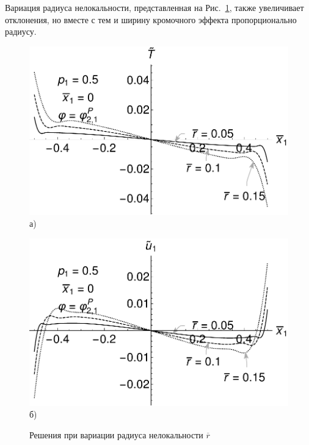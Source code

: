 Вариация радиуса нелокальности, представленная на Рис.~\ref{fig:VariationR}, также увеличивает отклонения, но вместе с тем и ширину кромочного эффекта пропорционально радиусу.

\begin{figure}[ht]
    \begin{minipage}[b][][b]{0.49\linewidth}\centering
        \includegraphics[width=\linewidth]{pics/TVarR.pdf} \\ а)
    \end{minipage}
    \hfill
    \begin{minipage}[b][][b]{0.49\linewidth}\centering
        \includegraphics[width=\linewidth]{pics/U1VarR.pdf} \\ б)
    \end{minipage}
    \caption{Решения при вариации радиуса нелокальности $\overline{r}$}
    \label{fig:VariationR}
\end{figure}

